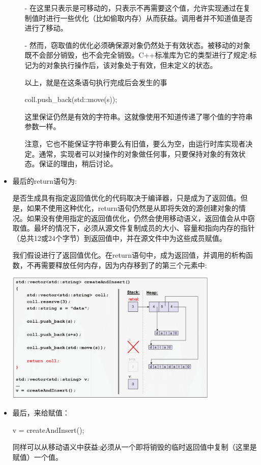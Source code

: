 \begin{itemize}
	\begin{itemize}
		\item[-] 在这里只表示是可移动的，只表示不再需要这个值，允许实现通过在复制值时进行一些优化（比如偷取内存）从而获益。调用者并不知道值是否进行了移动。
		\item[-] 然而，窃取值的优化必须确保源对象仍然处于有效状态。被移动的对象既不会部分销毁，也不会完全销毁。C++标准库为它的类型进行了规定:标记为的对象执行操作后，该对象处于有效，但未定义的状态。

		以上，就是在这条语句执行完成后会发生的事
\begin{cppcode}
coll.push_back(std::move(s));
\end{cppcode}
		这里保证仍然是有效的字符串。这就像使用不知道传递了哪个值的字符串参数一样。

		注意，它也不能保证字符串要么有旧值，要么为空，由运行时库实现者决定。通常，实现者可以对操作的对象做任何事，只要保持对象的有效状态。保证的理由，稍后讨论。
	\end{itemize}

	\item {}最后的return语句为:

	\begin{cppcode}
	return coll;
}
	\end{cppcode}
	是否生成具有指定返回值优化的代码取决于编译器，只是成为了返回值。但是，如果不使用这种优化，return语句仍然是从即将失效的源创建对象的情况。如果没有使用指定的返回值优化，仍然会使用移动语义，返回值会从中窃取值。最坏的情况下，必须从源文件复制成员的大小、容量和指向内存的指针（总共12或24个字节）到返回值中，并在源文件中为这些成员赋值。

	我们假设进行了返回值优化。在return语句中，成为返回值，并调用的析构函数，不再需要释放任何内存，因为内存移到了的第三个元素中:
\begin{center}
		\includegraphics[width=0.8\textwidth]{part1/ch1/images/15}
	\end{center}
	\item 最后，来给赋值：
\begin{cppcode}
v = createAndInsert();
\end{cppcode}
	同样可以从移动语义中获益:必须从一个即将销毁的临时返回值中复制（这里是赋值）一个值。


\end{itemize}
